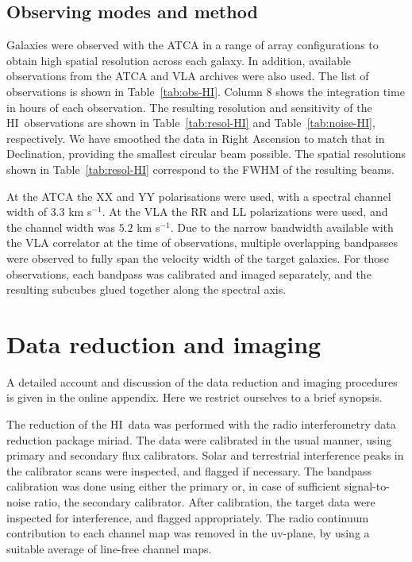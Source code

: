 \documentclass[traditabstract]{aa} %
\newcommand\HI{H{\small I}}
\newcommand\kms{km s$^{-1}$}
\begin{document}
\subsection{Observing modes and method}

Galaxies were observed with the ATCA in a range of array configurations
to obtain high spatial resolution across each galaxy.  In addition, available
observations from the ATCA and VLA archives
were also used. The list of observations is shown in
Table~\ref{tab:obs-HI}. Column 8 shows the integration time in hours
of each observation. The resulting resolution and
sensitivity of the \HI\ observations are shown in Table~\ref{tab:resol-HI}
and Table~\ref{tab:noise-HI}, respectively. We have smoothed the data in 
Right Ascension to match that in Declination, providing the smallest circular
beam possible. The spatial resolutions shown in Table~\ref{tab:resol-HI} 
correspond to the FWHM of the resulting beams.

At the ATCA the XX and YY polarisations were used, with a spectral
channel width of $3.3$ \kms.  At the VLA the RR and LL polarizations
were used, and the channel width was $5.2$ \kms. Due to the narrow
bandwidth available with the VLA correlator at the time of observations,
multiple overlapping bandpasses were observed to fully span the
velocity width of the target galaxies. For those observations, each
bandpass was calibrated and imaged separately, and the resulting
subcubes glued together along the spectral axis.




\section{Data reduction and imaging}
\label{sec:red-HI}

A detailed account and discussion of the data reduction 
and imaging procedures
is given in the online appendix. Here we restrict ourselves to a brief
synopsis.

The reduction of the \HI\ data was performed with the 
radio interferometry data reduction package {\sc miriad}. The
data were calibrated in the usual manner, using primary and
secondary flux calibrators. Solar and terrestrial interference
peaks in the calibrator scans were inspected, and flagged if
necessary. The bandpass calibration was done using either the 
primary or, in case of sufficient signal-to-noise ratio, the 
secondary calibrator. After calibration, the target data were
inspected for interference, and flagged appropriately.
The radio continuum contribution to each channel map was removed
in the uv-plane, by using a suitable average of line-free channel
maps.
\end{document}
